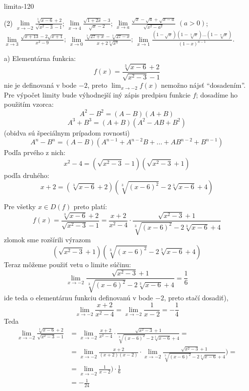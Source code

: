 \begin{defproblem}{limita-120}
\begin{tasks}(2)
    \task $\lim\limits_{{x \to -2}} \frac{\sqrt[3]{x-6}+2}{\sqrt{x^2-3}-1}$;
    \task $\lim\limits_{{x \to 4}} \frac{\sqrt{1+2x}-3}{\sqrt{x}-2}$;
    \task $\lim\limits_{{x \to a}} \frac{\sqrt{x}-\sqrt{a}+\sqrt{x-a}}{\sqrt{x^2-a^2}}$ $(a>0)$;
    \task $\lim\limits_{{x \to 3}} \frac{\sqrt{x+13}-2\sqrt{x+1}}{x^2-9}$;
    \task $\lim\limits_{{x \to 0}} \frac{\sqrt[3]{27+x}-\sqrt[3]{27-x}}{x+2\sqrt[3]{x^4}}$;
    \task $\lim\limits_{{x \to 1}} \frac{(1-\sqrt{x})(1-\sqrt[3]{x})...(1-\sqrt[n]{x})}{(1-x)^{n-1}}$.
\end{tasks}
\begin{solution}
    a) Elementárna funkcia:
    \[
        f(x) = \frac{\sqrt[3]{x - 6} + 2}{\sqrt{x^2 - 3} - 1}
    \]
    nie je definovaná v bode $-2$, preto $\lim_{x \rightarrow -2} f(x)$ nemožno
    nájsť ``dosadením''. Pre výpočet limity bude výhodnejší iný zápis predpisu
    funkcie $f$; dosadíme ho použitím vzorca:
    \[
        A^2 - B^2 = (A - B)(A + B)
    \]
    \[
        A^3 + B^3 = (A + B)(A^2 - AB + B^2)
    \]
    (obidva sú špeciálnym prípadom rovnosti)
    \[
        A^n - B^n = (A - B)(A^{n - 1} + A^{n - 2}B + ... + AB^{n - 2} + B^{n - 1})
    \]
    Podľa prvého z nich:
    \[
        x^2 - 4 = (\sqrt{x^2 - 3} - 1)(\sqrt{x^2 - 3} + 1)
    \]
    podľa druhého:
    \[
        x + 2=(\sqrt[3]{x - 6} + 2)(\sqrt[3]{(x - 6)^2} - 2\sqrt[3]{x - 6} + 4)
    \]

    Pre všetky $x \in D(f)$ preto platí:
    \[
        f(x)
            = \frac{\sqrt[3]{x - 6} + 2}{\sqrt{x^2 - 3} - 1}
            = \frac{x + 2}{x^2 - 4}
              \cdot
              \frac{\sqrt{x^2 - 3} + 1}{\sqrt[3]{(x - 6)^2} - 2\sqrt[3]{x - 6} + 4}
    \]
    zlomok sme rozšírili výrazom
    \[
        (\sqrt{x^2-3} + 1)(\sqrt[3]{(x - 6)^2} - 2\sqrt[3]{x - 6} + 4)
    \]
    Teraz môžeme použiť vetu o limite súčinu:
    \[
        \lim_{x \to -2}
            \frac{\sqrt{x^2 - 3} + 1}{\sqrt[3]{(x - 6)^2} - 2\sqrt[3]{x - 6} + 4}
            = \frac{1}{6}
    \]
    ide teda o elementárnu funkciu definovanú v bode $-2$, preto stačí dosadiť),
    \[
        \lim_{x \to -2} \frac{x+2}{x^2-4}
        = \lim_{x \to -2} \frac{1}{x-2}
        = -\frac{1}{4}
    \]
    Teda
    \begin{align*}
        \lim_{x \to -2} \frac{\sqrt[3]{x-6}+2}{\sqrt{x^2-3}-1}
        &= \lim_{x \to -2} \frac{x+2}{x^2-4} \cdot \frac{\sqrt{x^2-3}+1}{\sqrt[3]{(x-6)^2}-2\sqrt[3]{x-6}+4} = \\
        &= \lim_{x \to -2} \frac{x+2}{(x+2)(x-2)}
            \cdot
            \lim_{x \to -2} \frac{\sqrt{x^2-3}+1}{\sqrt[3]{(x-6)^2}-2\sqrt[3]{x-6}+4}) = \\
        &= \lim_{x \to -2} \frac{1}{x-2})\cdot \frac{1}{6} \\
        &= -\frac{1}{24}
    \end{align*}
\end{solution}
\end{defproblem}


